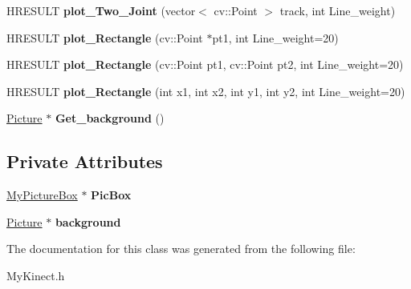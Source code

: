 \begin{DoxyCompactItemize}
\item 
\mbox{\label{class_kinect_1_1view_ab4116e8972e81843631f0fbbd8ee1be1}} 
H\+R\+E\+S\+U\+LT {\bfseries plot\+\_\+\+Two\+\_\+\+Joint} (vector$<$ cv\+::\+Point $>$ track, int Line\+\_\+weight)
\item 
\mbox{\label{class_kinect_1_1view_a55c49877054b51ecf27ee17a5d6b2d14}} 
H\+R\+E\+S\+U\+LT {\bfseries plot\+\_\+\+Rectangle} (cv\+::\+Point $\ast$pt1, int Line\+\_\+weight=20)
\item 
\mbox{\label{class_kinect_1_1view_aafb5453634426cb94fd148b7d11d9c63}} 
H\+R\+E\+S\+U\+LT {\bfseries plot\+\_\+\+Rectangle} (cv\+::\+Point pt1, cv\+::\+Point pt2, int Line\+\_\+weight=20)
\item 
\mbox{\label{class_kinect_1_1view_aa6a5889358662e58d490a2403874ef52}} 
H\+R\+E\+S\+U\+LT {\bfseries plot\+\_\+\+Rectangle} (int x1, int x2, int y1, int y2, int Line\+\_\+weight=20)
\item 
\mbox{\label{class_kinect_1_1view_a72e1da788d1c2af86d52ecb489f9a619}} 
\hyperlink{class_kinect_1_1_picture}{Picture} $\ast$ {\bfseries Get\+\_\+background} ()
\end{DoxyCompactItemize}
\subsection*{Private Attributes}
\begin{DoxyCompactItemize}
\item 
\mbox{\label{class_kinect_1_1view_a75bcc310d5c53f3bfe71d42b316ae8a0}} 
\hyperlink{class_kinect_1_1_my_picture_box}{My\+Picture\+Box} $\ast$ {\bfseries Pic\+Box}
\item 
\mbox{\label{class_kinect_1_1view_abf13ee83fcb521229e1cf955d4a0ff47}} 
\hyperlink{class_kinect_1_1_picture}{Picture} $\ast$ {\bfseries background}
\end{DoxyCompactItemize}


The documentation for this class was generated from the following file\+:\begin{DoxyCompactItemize}
\item 
My\+Kinect.\+h\end{DoxyCompactItemize}
